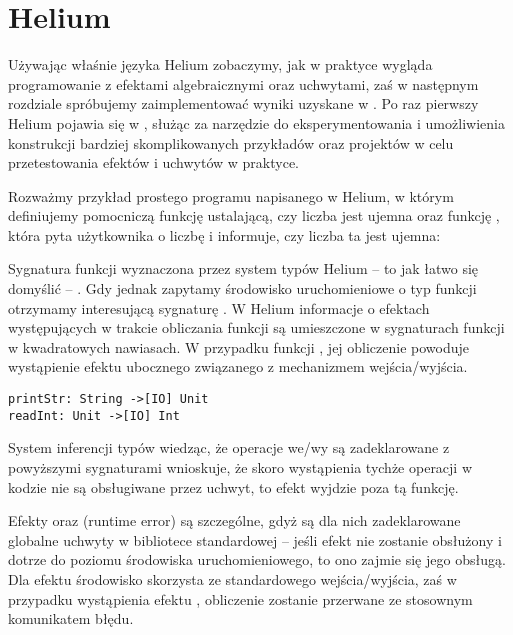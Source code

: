 \section{Helium}

\lstset{language=Haleff, showstringspaces=false}

Używając właśnie języka Helium zobaczymy, jak w praktyce wygląda programowanie z efektami algebraicznymi oraz uchwytami, zaś w następnym rozdziale spróbujemy zaimplementować wyniki uzyskane w \BSaLC\cite{mokhov2018build, mokhov2020build}. Po raz pierwszy Helium pojawia się w \cite{biernacki2019abstracting}, służąc za narzędzie do eksperymentowania i umożliwienia konstrukcji bardziej skomplikowanych przykładów oraz projektów w celu przetestowania efektów i uchwytów w praktyce.

Rozważmy przykład prostego programu napisanego w Helium, w którym definiujemy pomocniczą funkcję  ustalającą, czy liczba jest ujemna oraz funkcję , która pyta użytkownika o liczbę i informuje, czy liczba ta jest ujemna:



Sygnatura funkcji  wyznaczona przez system typów Helium -- to jak łatwo się domyślić -- . Gdy jednak zapytamy środowisko uruchomieniowe o typ funkcji  otrzymamy interesującą sygnaturę . W Helium informacje o efektach występujących w trakcie obliczania funkcji są umieszczone w sygnaturach funkcji w kwadratowych nawiasach. W przypadku funkcji , jej obliczenie powoduje wystąpienie efektu ubocznego związanego z mechanizmem wejścia/wyjścia. 

\begin{lstlisting}
printStr: String ->[IO] Unit
readInt: Unit ->[IO] Int
\end{lstlisting}

System inferencji typów wiedząc, że operacje we/wy są zadeklarowane z powyższymi sygnaturami wnioskuje, że skoro wystąpienia tychże operacji w kodzie  nie są obsługiwane przez uchwyt, to efekt  wyjdzie poza tą funkcję.

Efekty  oraz  (runtime error) są szczególne, gdyż są dla nich zadeklarowane globalne uchwyty w bibliotece standardowej -- jeśli efekt nie zostanie obsłużony i dotrze do poziomu środowiska uruchomieniowego, to ono zajmie się jego obsługą. Dla efektu  środowisko skorzysta ze standardowego wejścia/wyjścia, zaś w przypadku wystąpienia efektu , obliczenie zostanie przerwane ze stosownym komunikatem błędu.


